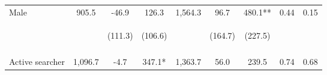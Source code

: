 \begin{table}[h!]
{\begin{tabular}{lcccccccc}
\noalign{\smallskip}Male & 905.5 & -46.9 & 126.3 & 1,564.3 & 96.7 & 480.1** & 0.44 & 0.15\\
 & \begin{footnotesize}\end{footnotesize} & \begin{footnotesize}(111.3)\end{footnotesize} & \begin{footnotesize}(106.6)\end{footnotesize} & \begin{footnotesize}\end{footnotesize} & \begin{footnotesize}(164.7)\end{footnotesize} & \begin{footnotesize}(227.5)\end{footnotesize} & \begin{footnotesize}\end{footnotesize} & \begin{footnotesize}\end{footnotesize}\\
 & \begin{footnotesize}\end{footnotesize} & \begin{footnotesize}[1.000]\end{footnotesize} & \begin{footnotesize}[0.077]\end{footnotesize} & \begin{footnotesize}\end{footnotesize} & \begin{footnotesize}[1.000]\end{footnotesize} & \begin{footnotesize}[0.222]\end{footnotesize} & \begin{footnotesize}\end{footnotesize} & \begin{footnotesize}\end{footnotesize}\\
\noalign{\smallskip}Active searcher & 1,096.7 & -4.7 & 347.1* & 1,363.7 & 56.0 & 239.5 & 0.74 & 0.68\\

\end{tabular}}
\end{table}
